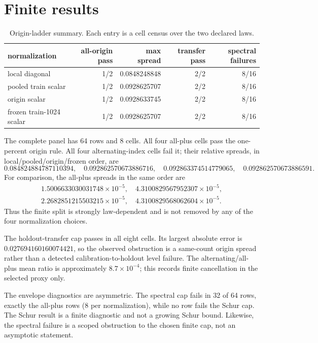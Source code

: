 \documentclass[10pt]{article}
\begin{document}
\section{Finite results}

\begin{table}[t]
\centering
\caption{Origin-ladder summary.  Each entry is a cell census over the two
declared laws.}
\label{tab:results}
\small
\begin{tabular}{@{}l r r r r@{}}
\toprule
normalization & all-origin pass & max spread & transfer pass & spectral failures\\
\midrule
local diagonal & 1/2 & 0.0848248848 & 2/2 & 8/16\\
pooled train scalar & 1/2 & 0.0928625707 & 2/2 & 8/16\\
origin scalar & 1/2 & 0.0928633745 & 2/2 & 8/16\\
frozen train-1024 scalar & 1/2 & 0.0928625707 & 2/2 & 8/16\\
\bottomrule
\end{tabular}
\end{table}

The complete panel has 64 rows and 8 cells.  All four all-plus cells pass the
one-percent origin rule.  All four alternating-index cells fail it; their
relative spreads, in local/pooled/origin/frozen order, are
\[
0.084824884787110394,\quad
0.092862570673886716,\quad
0.092863374514779065,\quad
0.092862570673886591.
\]
For comparison, the all-plus spreads in the same order are
\[
\begin{gathered}
1.5006633030031748\times10^{-5},\quad
4.3100829567952307\times10^{-5},\\
2.2682851215503215\times10^{-5},\quad
4.3100829568062604\times10^{-5}.
\end{gathered}
\]
Thus the finite split is strongly law-dependent and is not removed by any of
the four normalization choices.

The holdout-transfer cap passes in all eight cells.  Its largest absolute
error is $0.027694160160074421$, so the observed obstruction is a same-count
origin spread rather than a detected calibration-to-holdout level failure.
The alternating/all-plus mean ratio is approximately $8.7\times10^{-4}$;
this records finite cancellation in the selected proxy only.

The envelope diagnostics are asymmetric.  The spectral cap fails in 32 of 64
rows, exactly the all-plus rows (8 per normalization), while no row fails the
Schur cap.  The Schur result is a finite diagnostic and not a growing Schur
bound.  Likewise, the spectral failure is a scoped obstruction to the chosen
finite cap, not an asymptotic statement.
\end{document}
